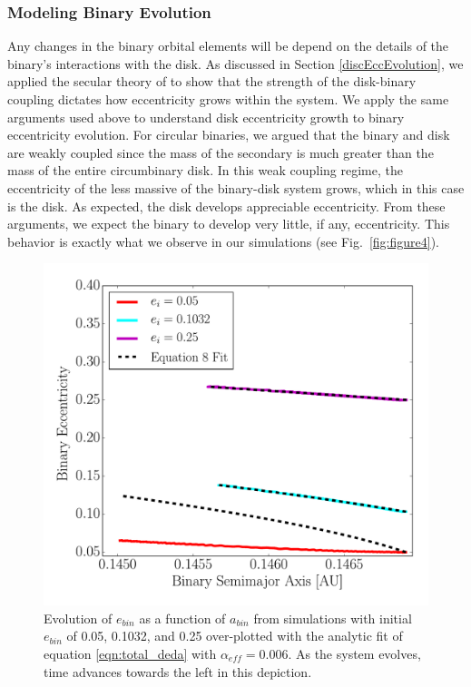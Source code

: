 
\subsubsection{Modeling Binary Evolution} \label{ModelBinaryEvolution}

Any changes in the binary orbital elements will be depend on the
details of the binary's interactions with the disk.  As discussed in
Section \ref{discEccEvolution}, we applied the secular theory of
\citet{Papaloizou01} to show that the strength of the disk-binary
coupling dictates how eccentricity grows within the system.   We apply the same arguments used above to understand disk eccentricity growth to binary eccentricity evolution.  For circular binaries, we argued that the binary and disk are weakly coupled since the mass of the secondary is much greater than the mass of the entire circumbinary disk.  In this weak coupling regime, the eccentricity of the less massive of the binary-disk system grows, which in this case is the disk.  As expected, the disk develops appreciable eccentricity.  From these arguments, we expect the binary to develop very little, if any, eccentricity.  This behavior is exactly what we observe in our simulations (see Fig.~\ref{fig:figure4}).

\begin{figure}
	\includegraphics[width=\columnwidth]{f8}
    \caption{Evolution of $e_{bin}$ as a
      function of $a_{bin}$ from simulations with initial $e_{bin}$ of
      0.05, 0.1032, and 0.25 over-plotted with the analytic fit of
      equation \ref{eqn:total_deda} with $\alpha_{eff} = 0.006$.
      As the system evolves, time advances towards the left in this
      depiction.}
    \label{fig:figure8}
\end{figure}

